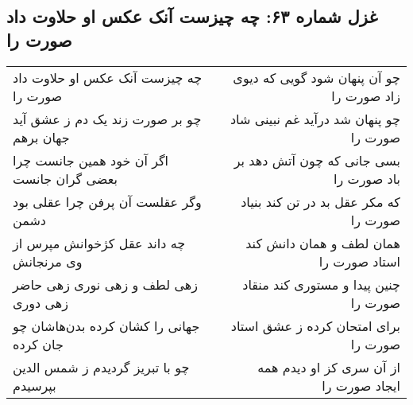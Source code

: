 \begin{center}
\section*{غزل شماره ۶۳: چه چیزست آنک عکس او حلاوت داد صورت را}
\label{sec:0063}
\begin{longtable}{l p{0.5cm} r}
چه چیزست آنک عکس او حلاوت داد صورت را
&&
چو آن پنهان شود گویی که دیوی زاد صورت را
\\
چو بر صورت زند یک دم ز عشق آید جهان برهم
&&
چو پنهان شد درآید غم نبینی شاد صورت را
\\
اگر آن خود همین جانست چرا بعضی گران جانست
&&
بسی جانی که چون آتش دهد بر باد صورت را
\\
وگر عقلست آن پرفن چرا عقلی بود دشمن
&&
که مکر عقل بد در تن کند بنیاد صورت را
\\
چه داند عقل کژخوانش مپرس از وی مرنجانش
&&
همان لطف و همان دانش کند استاد صورت را
\\
زهی لطف و زهی نوری زهی حاضر زهی دوری
&&
چنین پیدا و مستوری کند منقاد صورت را
\\
جهانی را کشان کرده بدن‌هاشان چو جان کرده
&&
برای امتحان کرده ز عشق استاد صورت را
\\
چو با تبریز گردیدم ز شمس الدین بپرسیدم
&&
از آن سری کز او دیدم همه ایجاد صورت را
\\
\end{longtable}
\end{center}
